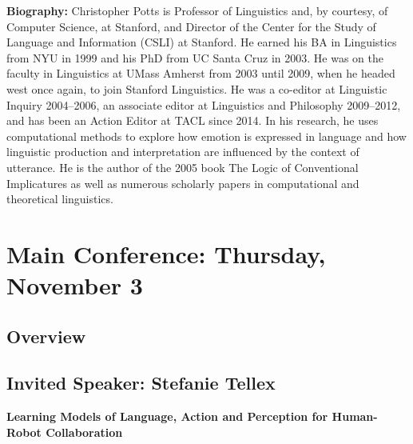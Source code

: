 \vspace{3em}

\vfill{}
\noindent \textbf{Biography:}  Christopher Potts is Professor of Linguistics and, by courtesy, of Computer Science, at Stanford, and Director of the Center for the Study of Language and Information (CSLI) at Stanford. He earned his BA in Linguistics from NYU in 1999 and his PhD from UC Santa Cruz in 2003. He was on the faculty in Linguistics at UMass Amherst from 2003 until 2009, when he headed west once again, to join Stanford Linguistics. He was a co-editor at Linguistic Inquiry 2004–2006, an associate editor at Linguistics and Philosophy 2009–2012, and has been an Action Editor at TACL since 2014. In his research, he uses computational methods to explore how emotion is expressed in language and how linguistic production and interpretation are influenced by the context of utterance. He is the author of the 2005 book The Logic of Conventional Implicatures as well as numerous scholarly papers in computational and theoretical linguistics.

\clearpage{}








%


\chapter{Main Conference: Thursday, November 3}
\thispagestyle{emptyheader}
\section*{Overview}

\clearpage{}

\section{Invited Speaker: Stefanie Tellex}

\begin{center}
\textbf{\Large{}Learning Models of Language, Action and Perception for Human-Robot Collaboration}{\Large{}\vspace{1em}
}
\par\end{center}{\Large \par}

